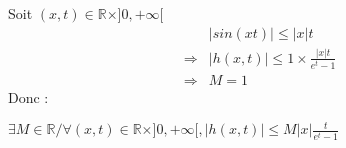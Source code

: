 Soit $(x, t)\in \mathbb{R}\times]0, +\infty[$\\
\[
  \begin{array}{rl}
                & \left|sin(xt)\right| \leq |x|t             \\
    \Rightarrow & |h(x, t)| \leq 1 \times \frac{|x|t}{e^t-1} \\
    \Rightarrow & M = 1
  \end{array}
\]
Donc :
\begin{result}
  $\exists M\in\mathbb{R} / \forall (x, t)\in \mathbb{R}\times]0, +\infty[, |h(x, t)| \leq M |x| \frac{t}{e^t-1}$
\end{result}
